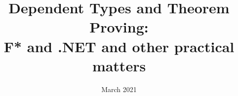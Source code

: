 \documentclass{beamer}
\title{Dependent Types and Theorem Proving: \\F* and .NET and other practical matters}
\author{}
\date{March 2021}
\begin{document}
\frame{\titlepage}
\frame{\tableofcontents}

















\end{document}
